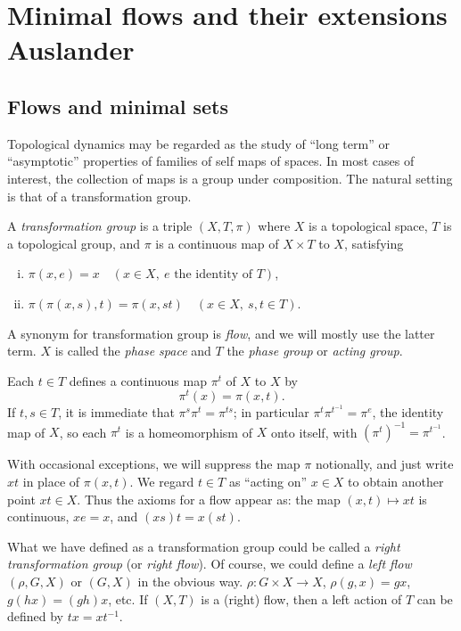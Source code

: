 \chapter{Minimal flows and their extensions Auslander}

\section{Flows and minimal sets}

Topological dynamics may be regarded as the study of ``long term'' or ``asymptotic'' properties of families of self maps of spaces. In most cases of interest, the collection of maps is a group under composition. The natural setting is that of a transformation group.

\begin{definition}
    A \emph{transformation group} is a triple $(X, T, \pi)$ where $X$ is a topological space, $T$ is a topological group, and $\pi$ is a continuous map of $X \times T$ to $X$, satisfying
    \begin{enumerate}[(i)]
        \item $\pi(x,e) = x \quad (x \in X,\ e \text{ the identity of } T)$,
        \item $\pi(\pi(x,s),t) = \pi(x,st) \quad (x \in X,\ s,t \in T)$.
    \end{enumerate}
\end{definition}

A synonym for transformation group is \emph{flow}, and we will mostly use the latter term. $X$ is called the \emph{phase space} and $T$ the \emph{phase group} or \emph{acting group}.

Each $t \in T$ defines a continuous map $\pi^{t}$ of $X$ to $X$ by
\[
    \pi^{t}(x) = \pi(x,t).
\]
If $t,s \in T$, it is immediate that $\pi^{s}\pi^{t} = \pi^{ts}$; in particular $\pi^{t}\pi^{t^{-1}} = \pi^{e}$, the identity map of $X$, so each $\pi^{t}$ is a homeomorphism of $X$ onto itself, with $(\pi^{t})^{-1} = \pi^{t^{-1}}$.


With occasional exceptions, we will suppress the map $\pi$ notionally, and just write $xt$ in place of $\pi(x,t)$. We regard $t \in T$ as ``acting on'' $x \in X$ to obtain another point $xt \in X$. Thus the axioms for a flow appear as: the map $(x,t) \mapsto xt$ is continuous, $xe = x$, and $(xs)t = x(st)$.

What we have defined as a transformation group could be called a \emph{right transformation group} (or \emph{right flow}). Of course, we could define a \emph{left flow} $(\rho, G, X)$ or $(G, X)$ in the obvious way. $\rho : G \times X \to X$, $\rho(g,x) = gx$, $g(hx) = (gh)x$, etc. If $(X, T)$ is a (right) flow, then a left action of $T$ can be defined by $tx = xt^{-1}$.



